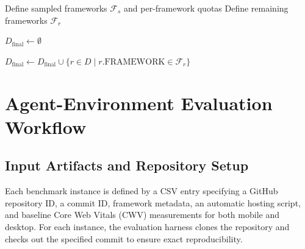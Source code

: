 \begin{algorithm}[t]
\caption{Framework-Stratified Diversity-Aware Subsampling}
\label{alg:subsampling}

Define sampled frameworks $\mathcal{F}_s$ and per-framework quotas\;
Define remaining frameworks $\mathcal{F}_r$\;

$D_{\text{final}} \leftarrow \emptyset$\;


$D_{\text{final}} \leftarrow D_{\text{final}} \cup \{ r \in D \mid r.\text{FRAMEWORK} \in \mathcal{F}_r \}$\;

\end{algorithm}



\section{Agent-Environment Evaluation Workflow}
\label{subsection: agent evaluation}
\subsection{Input Artifacts and Repository Setup}
Each benchmark instance is defined by a CSV entry specifying a GitHub repository ID, a commit ID, framework metadata, an automatic hosting script, and baseline Core Web Vitals (CWV) measurements for both mobile and desktop. For each instance, the evaluation harness clones the repository and checks out the specified commit to ensure exact reproducibility.

